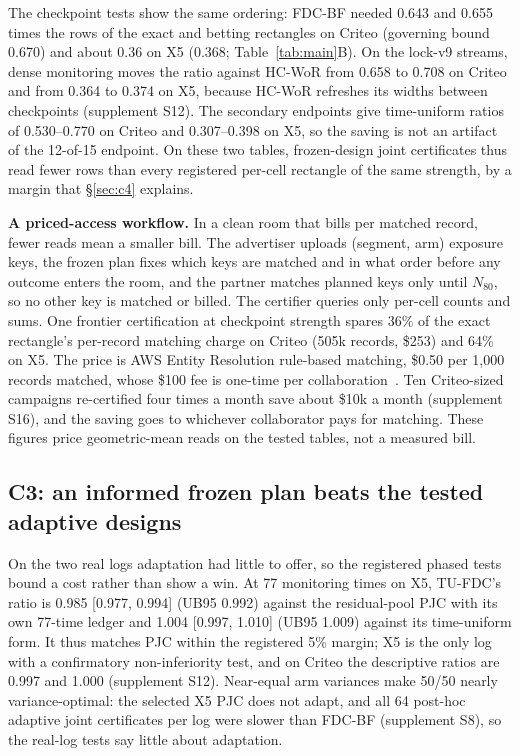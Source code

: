 \documentclass[sigconf,anonymous,review]{acmart}
\begin{document}
The checkpoint tests show the same ordering: FDC-BF needed 0.643 and 0.655 times the rows of the exact and betting rectangles on Criteo (governing bound 0.670) and about 0.36 on X5 (0.368; Table~\ref{tab:main}B). On the lock-v9 streams, dense monitoring moves the ratio against HC-WoR from 0.658 to 0.708 on Criteo and from 0.364 to 0.374 on X5, because HC-WoR refreshes its widths between checkpoints (supplement S12). The secondary endpoints give time-uniform ratios of 0.530--0.770 on Criteo and 0.307--0.398 on X5, so the saving is not an artifact of the 12-of-15 endpoint. On these two tables, frozen-design joint certificates thus read fewer rows than every registered per-cell rectangle of the same strength, by a margin that \S\ref{sec:c4} explains.

\textbf{A priced-access workflow.} In a clean room that bills per matched record, fewer reads mean a smaller bill. The advertiser uploads (segment, arm) exposure keys, the frozen plan fixes which keys are matched and in what order before any outcome enters the room, and the partner matches planned keys only until $N_{80}$, so no other key is matched or billed. The certifier queries only per-cell counts and sums. One frontier certification at checkpoint strength spares 36\% of the exact rectangle's per-record matching charge on Criteo (505k records, \$253) and 64\% on X5. The price is AWS Entity Resolution rule-based matching, \$0.50 per 1,000 records matched, whose \$100 fee is one-time per collaboration~\citep{awscleanrooms2026pricing}. Ten Criteo-sized campaigns re-certified four times a month save about \$10k a month (supplement S16), and the saving goes to whichever collaborator pays for matching. These figures price geometric-mean reads on the tested tables, not a measured bill.

\subsection{C3: an informed frozen plan beats the tested adaptive designs}\label{sec:c3}

On the two real logs adaptation had little to offer, so the registered phased tests bound a cost rather than show a win. At 77 monitoring times on X5, TU-FDC's ratio is 0.985 [0.977, 0.994] (UB95 0.992) against the residual-pool PJC with its own 77-time ledger and 1.004 [0.997, 1.010] (UB95 1.009) against its time-uniform form. It thus matches PJC within the registered 5\% margin; X5 is the only log with a confirmatory non-inferiority test, and on Criteo the descriptive ratios are 0.997 and 1.000 (supplement S12). Near-equal arm variances make 50/50 nearly variance-optimal: the selected X5 PJC does not adapt, and all 64 post-hoc adaptive joint certificates per log were slower than FDC-BF (supplement S8), so the real-log tests say little about adaptation.
\end{document}
